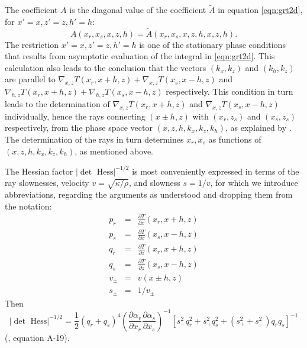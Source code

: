 The coefficient $A$ is the diagonal value of the coefficient
$\tilde{A}$ in equation \ref{eqn:grt2d}, for $x'=x,z'=z,h'=h$:
\begin{equation}
\label{eqn:diag}
A(x_r,x_s,x,z,h) = \tilde{A}(x_r,x_s,x,z,h,x,z,h).
\end{equation}
The restriction $x'=x,z'=z,h'=h$ is one of the stationary phase
conditions that results from 
asymptotic evaluation of the integral in \ref{eqn:grt2d}. This
calculation also leads to the
conclusion that the vectors $(k_x,k_z)$ and $(k_h,k_z)$ are parallel
to $\nabla_{x,z}T(x_r,x+h,z)+\nabla_{x,z}T(x_s,x-h,z)$ and
$\nabla_{h,z}T(x_r,x+h,z)+\nabla_{h,z}T(x_s,x-h,z)$ respectively. This
condition in turn leads to the determination of
$\nabla_{x,z}T(x_r,x+h,z)$ and $\nabla_{x,z}T(x_s,x-h,z)$
individually, hence the rays connecting $(x\pm h,z)$ with $(x_r,z_s)$
and $(x_s,z_s)$ respectively, from the phase space vector
$(x,z,h,k_x,k_z,k_h)$, as
explained by \cite{HouSymes:15}. The determination of the rays in turn
determines $x_r,x_s$ as functions of  $(x,z,h,k_x,k_z,k_h)$, as
mentioned above.

The Hessian factor $|\det \mbox{ Hess}|^{-1/2}$ is most
conveniently expressed in terms of the ray slownesses, velocity $v
= \sqrt{\kappa/\rho}$, and slowness $s=1/v$, for which we
introduce abbreviations, regarding the arguments as understood and
dropping them from the notation:
\begin{eqnarray}
p_r & = & \frac{\partial T}{\partial x}(x_r,x+h,z) \nonumber \\  
p_s & = & \frac{\partial T}{\partial x}(x_s,x-h,z) \nonumber \\  
q_r & = & \frac{\partial T}{\partial z}(x_r,x+h,z) \nonumber \\
q_s & = & \frac{\partial T}{\partial z}(x_s,x-h,z) \nonumber \\
v_{\pm} & = & v(x\pm h,z) \nonumber \\
\label{eqn:rayslow}   
s_{\pm} & = & 1/v_{\pm}
\end{eqnarray}
Then
\begin{equation}
\label{eqn:hess}
|\det \mbox{ Hess}|^{-1/2} =\frac{1}{2} (q_r+q_s)^4\left(\frac{\partial 
    \alpha_r}{\partial x_r}\frac{\partial \alpha_s}{\partial 
    x_s}\right)^{-1}[s_-^2q_r^2 + s_+^2q_s^2 + (s_+^2+s_-^2)q_rq_s]^{-1}
\end{equation}
(\cite{HouSymes:15}, equation A-19).

